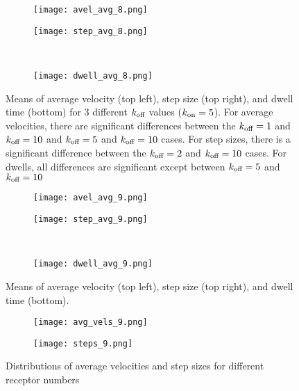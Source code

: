 \documentclass{article}
\newcommand{\tn}{\textnormal}
\begin{document}
\begin{figure}[h]
  \centering
  \begin{subfigure}{0.49\textwidth}
    \texttt{[image: avel\_avg\_8.png]}
  \end{subfigure}
  \hfill
  \begin{subfigure}{0.49\textwidth}
    \texttt{[image: step\_avg\_8.png]}
  \end{subfigure}
  \\
  \begin{subfigure}{0.49\textwidth}
    \texttt{[image: dwell\_avg\_8.png]}
  \end{subfigure}
  \label{fig:stats8}
  \caption{Means of average velocity (top left), step size (top
    right), and dwell time (bottom) for 3 different $k_\tn{off}$
    values ($k_\tn{on} = 5$). For average velocities, there are
    significant differences between the $k_\tn{off} = 1$ and
    $k_\tn{off} = 10$ and $k_\tn{off} = 5$ and $k_\tn{off} = 10$
    cases. For step sizes, there is a significant difference between
    the $k_\tn{off} = 2$ and $k_\tn{off} = 10$ cases. For dwells,
    all differences are significant except between $k_\tn{off} = 5$
    and $k_\tn{off} = 10$}
\end{figure}

\begin{figure}[h]
  \centering
  \begin{subfigure}{0.49\textwidth}
    \texttt{[image: avel\_avg\_9.png]}
  \end{subfigure}
  \hfill
  \begin{subfigure}{0.49\textwidth}
    \texttt{[image: step\_avg\_9.png]}
  \end{subfigure}
  \\
  \begin{subfigure}{0.49\textwidth}
    \texttt{[image: dwell\_avg\_9.png]}
  \end{subfigure}
  \label{fig:stats9}
  \caption{Means of average velocity (top left), step size (top
    right), and dwell time (bottom).}
\end{figure}

\begin{figure}[h]
  \centering
  \begin{subfigure}{0.49\textwidth}
    \texttt{[image: avg\_vels\_9.png]}
  \end{subfigure}
  \hfill
  \begin{subfigure}{0.49\textwidth}
    \texttt{[image: steps\_9.png]}
  \end{subfigure}
  \caption{Distributions of average velocities and step sizes for
    different receptor numbers}
  \label{fig:avg-vels9}
\end{figure}
\end{document}
